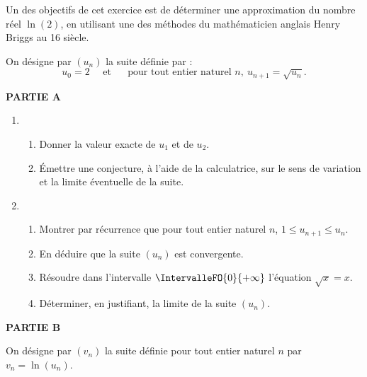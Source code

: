 Un des objectifs de cet exercice est de déterminer une approximation du nombre réel $\ln(2)$, en utilisant une des méthodes du mathématicien anglais Henry Briggs au 16 siècle.

On désigne par $\left(u_{n}\right)$ la suite définie par : \[u_{0}=2 \quad \text { et } \quad \text { pour tout entier naturel } n,~u_{n+1}=\sqrt{u_{n}}.\]

\textbf{PARTIE A}

\begin{enumerate}
	\item
	\begin{enumerate}
		\item Donner la valeur exacte de $u_{1}$ et de $u_{2}$.
		\item Émettre une conjecture, à l'aide de la calculatrice, sur le sens de variation et la limite éventuelle de la suite.
	\end{enumerate}
	\item
	\begin{enumerate}
		\item Montrer par récurrence que pour tout entier naturel $n$, $1 \leqslant u_{n+1} \leqslant u_{n}$.
		\item En déduire que la suite $\left(u_{n}\right)$ est convergente.
		\item Résoudre dans l'intervalle $\IntervalleFO{0}{+\infty}$ l'équation $\sqrt{x}=x$.
		\item Déterminer, en justifiant, la limite de la suite $\left(u_{n}\right)$.
	\end{enumerate}
\end{enumerate}

\textbf{PARTIE B}

\medskip

On désigne par $\left(v_{n}\right)$ la suite définie pour tout entier naturel $n$ par $v_{n}=\ln{\left(u_{n}\right)}$.

